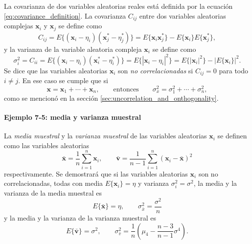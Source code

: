 \documentclass[a4paper]{report}
\newcommand{\x}{\mathbf{x}}
\begin{document}
La covarianza de dos variables aleatorias reales está definida por la ecuación \ref{eq:covariance_definition}. La covarianza \(C_{ij}\) entre dos variables aleatorias complejas \(\x_i\) y \(\x_j\) se define como
\[
 C_{ij}=E\{(\x_i-\eta_i)(\x^*_j-\eta^*_j)\}=E\{\x_i\x^*_j\}-E\{\x_i\}E\{\x^*_j\},
\]
y la varianza de la variable aleatoria compleja \(\x_i\) se define como
\[
 \sigma_i^2=C_{ii}=E\{(\x_i-\eta_i)(\x^*_i-\eta^*_i)\}=E\{|\x_i-\eta_i|^2\}=E\{|\x_i|^2\}-|E\{\x_i\}|^2.
\]
Se dice que las variables aleatorias \(\x_i\) son \emph{no correlacionadas} si \(C_{ij}=0\) para todo \(i\neq j\). En ese caso se cumple que si
\begin{equation}\label{eq:variance_sum_of_uncorrelated_rv}
 \x=\x_1+\cdots+\x_n,\qquad\textrm{entonces}\qquad\sigma_x^2=\sigma_1^2+\cdots+\sigma_n^2,
\end{equation}
como se mencionó en la sección \ref{sec:uncorrelation_and_onthogonality}.

\paragraph{Ejemplo 7-5: media y varianza muestral}

La \emph{media muestral} y la \emph{varianza muestral} de las variables aleatorias \(\x_i\) se definen como las variables aleatorias
\begin{equation}\label{eq:sample_mean_and_variance}
 \bar{\x}=\frac{1}{n}\sum_{i=1}^{n}\x_i, \qquad \bar{\mathbf{v}}=\frac{1}{n-1}\sum_{i=1}^{n}(\x_i-\bar{\x})^2
\end{equation}
respectivamente. Se demostrará que si las variables aleatorias \(\x_i\) son no correlacionadas, todas con media \(E\{\x_i\}=\eta\) y varianza \(\sigma_i^2=\sigma^2\), la media y la varianza de la media muestral es
\[
 E\{\bar{\x}\}=\eta,\qquad \sigma_{\bar{x}}^2=\frac{\sigma^2}{n}
\]
y la media y la varianza de la varianza muestral es
\[
 E\{\bar{\mathbf{v}}\}=\sigma^2,\qquad \sigma^2_{\bar{v}}=\frac{1}{n}\left(\mu_4-\frac{n-3}{n-1}\sigma^4\right).
\]
\end{document}
